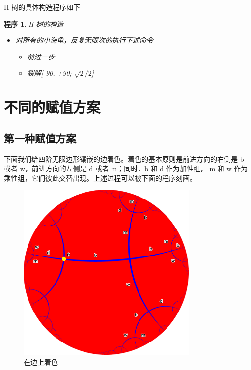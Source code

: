 \documentclass[a4paper,12pt]{article}
\newtheorem{program}{程序}
\begin{document}
H-树的具体构造程序如下

\begin{program}
H-树的构造
\begin{itemize}
\item 对所有的小海龟，反复无限次的执行下述命令
\begin{itemize}\item 前进一步 \item 裂解[-90, +90; $\sqrt{2} / 2$] \end{itemize}
\end{itemize}
\end{program}

\newpage

\section{不同的赋值方案}

\subsection{第一种赋值方案}

下面我们给四阶无限边形镶嵌的边着色。着色的基本原则是前进方向的右侧是 b 或者 w，前进方向的左侧是 d 或者 m；同时，b 和 d 作为加性组，
m 和 w 作为乘性组，它们彼此交替出现。上述过程可以被下面的程序刻画。

\begin{figure}[ht]
\centering
\includegraphics[width=3.5in]{images/H2_tiling_with_color_1.png}
\caption{在边上着色}
\end{figure}
\end{document}
